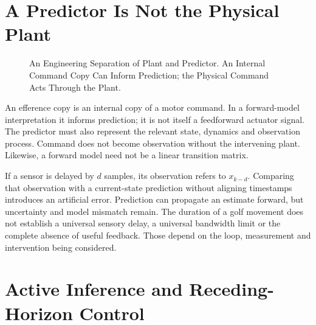 \section{A Predictor Is Not the Physical Plant}

\begin{figure}[ht]
\centering
{}
\caption{An Engineering Separation of Plant and Predictor. An Internal Command
Copy Can Inform Prediction; the Physical Command Acts Through the Plant.}
\label{fig:ch5:ideomotor-principle}
\end{figure}

An efference copy is an internal copy of a motor command. In a forward-model
interpretation it informs prediction; it is not itself a feedforward actuator
signal. The predictor must also represent the relevant state, dynamics and
observation process. Command does not become observation without the intervening
plant. Likewise, a forward model need not be a linear transition matrix.

If a sensor is delayed by $d$ samples, its observation refers to $x_{k-d}$.
Comparing that observation with a current-state prediction without aligning
timestamps introduces an artificial error. Prediction can propagate an estimate
forward, but uncertainty and model mismatch remain. The duration of a golf
movement does not establish a universal sensory delay, a universal bandwidth
limit or the complete absence of useful feedback. Those depend on the loop,
measurement and intervention being considered.

\section{Active Inference and Receding-Horizon Control}

